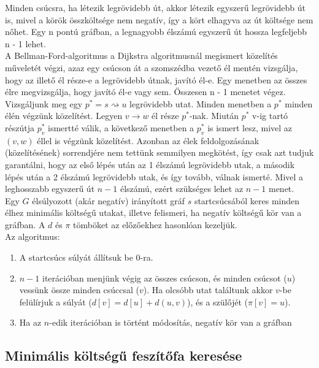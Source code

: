 \documentclass[margin=0px]{article}
\begin{document}
    \noindent Minden csúcsra, ha létezik legrövidebb út, akkor létezik egyszerű legrövidebb út is, mivel a körök összköltsége nem negatív, így a kört elhagyva az út költsége nem nőhet. Egy n pontú gráfban, a legnagyobb élszámú egyszerű út hossza legfeljebb n - 1 lehet.\\

    \noindent A Bellman-Ford-algoritmus a Dijkstra algoritmusnál megismert közelítés műveletét végzi, azaz egy csúcson át a szomszédba vezető él mentén vizsgálja, hogy az illető él része-e a legrövidebb útnak, javító él-e. Egy menetben az összes élre megvizsgálja, hogy javító él-e vagy sem. Összesen n - 1 menetet végez.\\

    
    \noindent Vizsgáljunk meg egy $p^* = s \rightsquigarrow u$ legrövidebb utat. Minden menetben a $p^*$ minden élén végzünk közelítést. Legyen $v \rightarrow w$ él része $p^*$-nak. Miután $p^*$ v-ig tartó részútja $p^*_{v}$ ismertté válik, a következő menetben a $p^*_{v}$ is ismert lesz, mivel az $(v,w)$ éllel is végzünk közelítést. Azonban az élek feldolgozásának (közelítésének) sorrendjére nem tettünk semmilyen megkötést, így csak azt tudjuk garantálni, hogy az első lépés után az 1 élszámú legrövidebb utak, a második lépés után a 2 élszámú legrövidebb utak, és így tovább, válnak ismerté. Mivel a leghosszabb egyszerű út $n - 1$ élszámú, ezért szükséges lehet az $n - 1$ menet.\\

    \noindent Egy $G$ élsúlyozott (akár negatív) irányított gráf $s$ startcsúcsából keres minden élhez minimális költségű utakat, illetve felismeri, ha negatív költségű kör van a gráfban. A $d$ és $\pi$ tömböket az előzőekhez hasonlóan kezeljük.\\
					
	Az algoritmus:
	\begin{enumerate}
    	\item A startcsúcs súlyát állítsuk be 0-ra.
        \item $n-1$ iterációban menjünk végig az összes csúcson, és minden csúcsot ($u$) vessünk össze minden csúccsal ($v$). Ha olcsóbb utat találtunk akkor $v$-be felülírjuk a súlyát ($d[v] = d[u]+d(u,v)$), és a szülőjét ($\pi[v] = u$).
		\item Ha az $n$-edik iterációban is történt módosítás, negatív kör van a gráfban
	\end{enumerate}

	\subsection*{Minimális költségű feszítőfa keresése}
\end{document}

